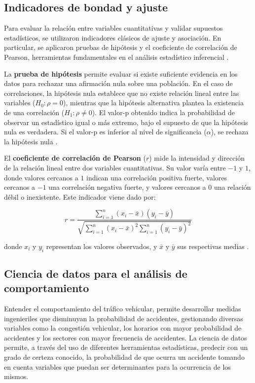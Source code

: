 \documentclass[12pt]{article}
\begin{document}
\subsection{Indicadores de bondad y ajuste}

Para evaluar la relación entre variables cuantitativas y validar supuestos estadísticos, se utilizaron indicadores clásicos de ajuste y asociación. En particular, se aplicaron pruebas de hipótesis y el coeficiente de correlación de Pearson, herramientas fundamentales en el análisis estadístico inferencial \parencite{devore2011, montgomery2018}.

La \textbf{prueba de hipótesis} permite evaluar si existe suficiente evidencia en los datos para rechazar una afirmación nula sobre una población. En el caso de correlaciones, la hipótesis nula establece que no existe relación lineal entre las variables (\( H_0 : \rho = 0 \)), mientras que la hipótesis alternativa plantea la existencia de una correlación (\( H_1 : \rho \neq 0 \)). El valor-p obtenido indica la probabilidad de observar un estadístico igual o más extremo, bajo el supuesto de que la hipótesis nula es verdadera. Si el valor-p es inferior al nivel de significancia (\( \alpha \)), se rechaza la hipótesis nula \parencite{devore2011}.

El \textbf{coeficiente de correlación de Pearson} (\( r \)) mide la intensidad y dirección de la relación lineal entre dos variables cuantitativas. Su valor varía entre $-1$ y $1$, donde valores cercanos a $1$ indican una correlación positiva fuerte, valores cercanos a $-1$ una correlación negativa fuerte, y valores cercanos a $0$ una relación débil o inexistente. Este indicador viene dado por:

\begin{equation}
r = \frac{\sum_{i=1}^{n}(x_i - \bar{x})(y_i - \bar{y})}{\sqrt{\sum_{i=1}^{n}(x_i - \bar{x})^2 \sum_{i=1}^{n}(y_i - \bar{y})^2}}
\end{equation}

donde \( x_i \) y \( y_i \) representan los valores observados, y \( \bar{x} \) y \( \bar{y} \) sus respectivas medias \parencite{montgomery2018}.

\subsection{Ciencia de datos para el análisis de comportamiento}

Entender el comportamiento del tráfico vehicular, permite desarrollar medidas ingenieriles que disminuyan la probabilidad de accidentes, gestionando diversas variables como la congestión vehicular, los horarios con mayor probabilidad de accidentes y los sectores con mayor frecuencia de accidentes. La ciencia de datos permite, a través del uso de diferentes herramientas estadísticas, predecir con un grado de certeza conocido, la probabilidad de que ocurra un accidente tomando en cuenta variables que puedan ser determinantes para la ocurrencia de los mismos.
\end{document}
